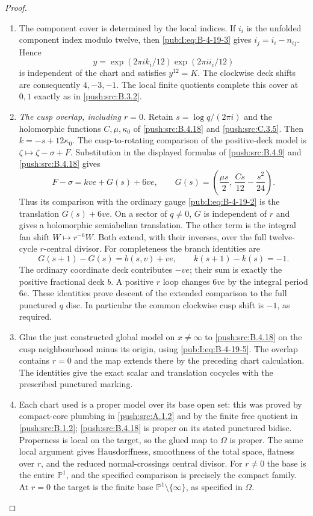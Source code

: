 \begin{proof}
\begin{enumerate}[label=\arabic*.,leftmargin=*]
\item The component cover is determined by the local indices.
If $i_i$ is the
unfolded component index modulo twelve, then
\eqref{pub:I:eq:B-4-19-3} gives $i_j=i_i-n_{ij}$. Hence
\[
 y=\exp(2\pi i k_i/12)\exp(2\pi i i_i/12)
\]
is independent of the chart and satisfies $y^{12}=K$.
The clockwise deck shifts are consequently $4,-3,-1$.
The local finite quotients complete this cover at
$0,1$ exactly as in \ref{push:src:B.3.2}.

\item \emph{The cusp overlap, including $r=0$.}
Retain $s=\log q/(2\pi i)$ and the holomorphic
functions $C,\mu,\kappa_0$ of \ref{push:src:B.4.18} and \ref{push:src:C.3.5}.
Then $k=-s+12\kappa_0$. The cusp-to-rotating comparison of the positive-deck model is
$\zeta\mapsto\zeta-\sigma+F$. Substitution in the
displayed formulas of \ref{push:src:B.4.9} and \ref{push:src:B.4.18} gives
\begin{equation}
 F-\sigma=kve+G(s)+6ve,
 \qquad
 G(s)=\left(\frac{\mu s}{2},\,
                    \frac{Cs}{12}-\frac{s^2}{24}\right).
\label{pub:I:eq:B-4-19-5}
\end{equation}
Thus its comparison with the ordinary gauge
\eqref{pub:I:eq:B-4-19-2} is the translation $G(s)+6ve$.
On a sector of $q\ne0$, $G$ is independent of $r$
and gives a holomorphic semiabelian translation.
The other term is the integral fan shift
$W\mapsto r^{-6}W$. Both extend, with their inverses,
over the full twelve-cycle $r$-central divisor.
For completeness the branch identities are
\[
 G(s+1)-G(s)=b(s,v)+ve,
 \qquad k(s+1)-k(s)=-1.
\]
The ordinary coordinate deck contributes $-ve$;
their sum is exactly the positive fractional deck
$b$. A positive $r$ loop changes $6ve$ by the
integral period $6e$. These identities prove
descent of the extended comparison to the full
punctured $q$ disc. In particular the common
clockwise cusp shift is $-1$, as required.

\item Glue the just constructed global model on
$x\ne\infty$ to \ref{push:src:B.4.18} on the cusp neighbourhood
minus its origin, using \eqref{pub:I:eq:B-4-19-5}. The overlap
contains $r=0$ and the map extends there by the
preceding chart calculation. The identities give the exact scalar and translation cocycles
with the prescribed punctured marking.

\item Each chart used is a proper model over its base
open set: this was proved by compact-core plumbing
in \ref{push:src:A.1.2} and by the finite free quotient in \ref{push:src:B.1.2};
\ref{push:src:B.4.18} is proper on its stated punctured bidisc.
Properness is local on the target, so the glued
map to $\Omega$ is proper. The same local argument
gives Hausdorffness, smoothness of the total space,
flatness over $r$, and the reduced normal-crossings
central divisor. For $r\ne0$ the base is the entire
$\mathbb P^1$, and the specified comparison is
precisely the compact family. At $r=0$ the target is the finite base $\mathbb P^1\setminus\{\infty\}$,
as specified in $\Omega$.

\end{enumerate}
\end{proof}